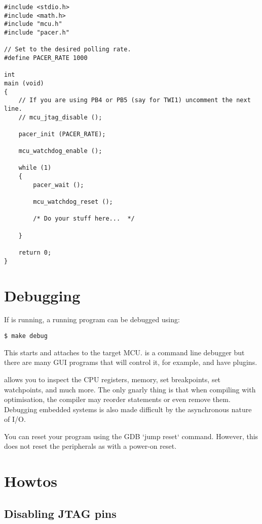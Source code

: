 \begin{verbatim}
#include <stdio.h>
#include <math.h>
#include "mcu.h"
#include "pacer.h"

// Set to the desired polling rate.
#define PACER_RATE 1000

int
main (void)
{
    // If you are using PB4 or PB5 (say for TWI1) uncomment the next line.
    // mcu_jtag_disable ();    

    pacer_init (PACER_RATE);    
    
    mcu_watchdog_enable ();

    while (1)
    {
        pacer_wait ();

        mcu_watchdog_reset ();

        /* Do your stuff here...  */
        
    }
    
    return 0;
}
\end{verbatim}

\section{Debugging}
\label{debugging}

If  is running, a running program can be debugged using:

\begin{verbatim}
$ make debug
\end{verbatim}

This starts  and attaches to the target MCU.  is a
command line debugger but there are many GUI programs that will control
it, for example,  and  have plugins.

 allows you to inspect the CPU registers, memory, set
breakpoints, set watchpoints, and much more. The only gnarly thing is
that when compiling with optimisation, the compiler may reorder
statements or even remove them. Debugging embedded systems is also made
difficult by the asynchronous nature of I/O.

You can reset your program using the GDB `jump reset` command. However,
this does not reset the peripherals as with a power-on reset.

\section{Howtos}
\label{howtos}

\subsection{Disabling JTAG pins}
\label{disabling-jtag-pins}

